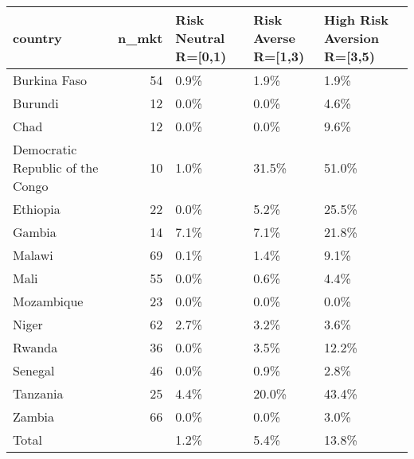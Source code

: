 \begin{table}[ht]
\centering
\begin{tabular}{lrlll}
  \hline
country & n\_mkt & Risk Neutral R=[0,1) & Risk Averse R=[1,3) & High Risk Aversion R=[3,5) \\ 
  \hline
Burkina Faso & 54 & 0.9\% & 1.9\% & 1.9\% \\ 
  Burundi & 12 & 0.0\% & 0.0\% & 4.6\% \\ 
  Chad & 12 & 0.0\% & 0.0\% & 9.6\% \\ 
  Democratic Republic of the Congo & 10 & 1.0\% & 31.5\% & 51.0\% \\ 
  Ethiopia & 22 & 0.0\% & 5.2\% & 25.5\% \\ 
  Gambia & 14 & 7.1\% & 7.1\% & 21.8\% \\ 
  Malawi & 69 & 0.1\% & 1.4\% & 9.1\% \\ 
  Mali & 55 & 0.0\% & 0.6\% & 4.4\% \\ 
  Mozambique & 23 & 0.0\% & 0.0\% & 0.0\% \\ 
  Niger & 62 & 2.7\% & 3.2\% & 3.6\% \\ 
  Rwanda & 36 & 0.0\% & 3.5\% & 12.2\% \\ 
  Senegal & 46 & 0.0\% & 0.9\% & 2.8\% \\ 
  Tanzania & 25 & 4.4\% & 20.0\% & 43.4\% \\ 
  Zambia & 66 & 0.0\% & 0.0\% & 3.0\% \\ 
  Total &  & 1.2\% & 5.4\% & 13.8\% \\ 
   \hline
\end{tabular}
\end{table}
